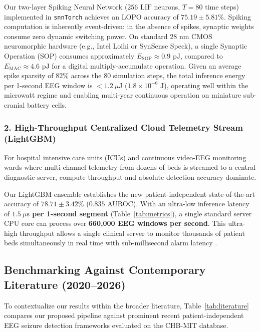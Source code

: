 \documentclass[pdflatex,sn-mathphys-num]{sn-jnl}
\begin{document}
Our two-layer Spiking Neural Network ($256\text{ LIF}$ neurons, $T=80$ time steps) implemented in \texttt{snnTorch} \cite{eshraghian2023training} achieves an LOPO accuracy of \textbf{$75.19 \pm 5.81\%$}. Spiking computation is inherently event-driven: in the absence of spikes, synaptic weights consume zero dynamic switching power. On standard $28\text{ nm}$ CMOS neuromorphic hardware (e.g., Intel Loihi \cite{davies2018loihi} or SynSense Speck), a single Synaptic Operation (SOP) consumes approximately $E_{\text{SOP}} \approx 0.9\text{ pJ}$, compared to $E_{\text{MAC}} \approx 4.6\text{ pJ}$ for a digital multiply-accumulate operation. Given an average spike sparsity of $82\%$ across the 80 simulation steps, the total inference energy per 1-second EEG window is \textbf{$< 1.2\ \mu\text{J}$} ($1.8 \times 10^{-6}\text{ J}$), operating well within the microwatt regime and enabling multi-year continuous operation on miniature sub-cranial battery cells.

\subsubsection{2. High-Throughput Centralized Cloud Telemetry Stream (LightGBM)}
For hospital intensive care units (ICUs) and continuous video-EEG monitoring wards where multi-channel telemetry from dozens of beds is streamed to a central diagnostic server, compute throughput and absolute detection accuracy dominate.

Our LightGBM ensemble establishes the new patient-independent state-of-the-art accuracy of \textbf{$78.71 \pm 3.42\%$} ($0.835$ AUROC). With an ultra-low inference latency of \textbf{$1.5\ \mu\text{s}$ per 1-second segment} (Table~\ref{tab:metrics}), a single standard server CPU core can process over \textbf{660,000 EEG windows per second}. This ultra-high throughput allows a single clinical server to monitor thousands of patient beds simultaneously in real time with sub-millisecond alarm latency \cite{liu2024explainable,alotaibi2024enhancing}.

\subsection{Benchmarking Against Contemporary Literature (2020--2026)}
To contextualize our results within the broader literature, Table~\ref{tab:literature} compares our proposed pipeline against prominent recent patient-independent EEG seizure detection frameworks evaluated on the CHB-MIT database.
\end{document}
